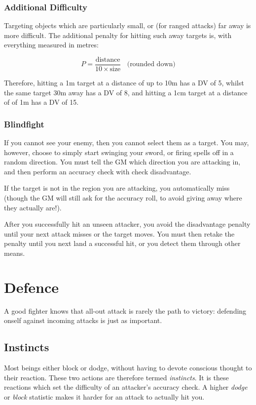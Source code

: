 \subsubsection{Additional Difficulty}

Targeting objects which are particularly small, or (for ranged attacks) far away is more difficult.  The additional penalty for hitting such away targets is, with everything measured in metres:

$$ P = \frac{\text{distance}}{10 \times \text{size}} ~~~~ \text{(rounded down)}$$

Therefore, hitting a 1m target at a distance of up to 10m has a DV of 5, whilst the same target 30m away has a DV of 8, and hitting a 1cm target at a distance of of 1m has a DV of 15. 

\subsubsection{Blindfight}\label{S:Unseen}

If you cannot see your enemy, then you cannot select them as a target. You may, however, choose to simply start swinging your sword, or firing spells off in a random direction. You must tell the GM which direction you are attacking in, and then perform an accuracy check with check disadvantage.

If the target is not in the region  you are attacking, you automatically miss (though the GM will still ask for the accuracy roll, to avoid giving away where they actually are!). 

After you successfully hit an unseen attacker, you avoid the disadvantage penalty until your next attack misses or the target moves. You must then retake the penalty until you next land a successful hit, or you detect them through other means. 


\section{Defence}\label{S:Accuracy}

A good fighter knows that all-out attack is rarely the path to victory: defending onself against incoming attacks is just as important. 

\subsection{Instincts} \label{S:AC}

Most beings either block or dodge, without having to devote conscious thought to their reaction. These two actions are therefore termed {\it instincts}. It is these reactions which set the difficulty of an attacker's accuracy check. A higher {\it dodge} or {\it block} statistic makes it harder for an attack to actually hit you. 

